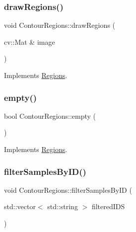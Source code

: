 \subsubsection{\texorpdfstring{draw\+Regions()}{drawRegions()}}
{\footnotesize\ttfamily void Contour\+Regions\+::draw\+Regions (\begin{DoxyParamCaption}\item[{cv\+::\+Mat \&}]{image }\end{DoxyParamCaption})\hspace{0.3cm}{\ttfamily [virtual]}}



Implements \hyperlink{struct_regions_adab32a2a00fc77abb6f4876939dc8505}{Regions}.

\mbox{\label{struct_contour_regions_ab8b13783859be86bdffa78c3a61e1387}} 
\subsubsection{\texorpdfstring{empty()}{empty()}}
{\footnotesize\ttfamily bool Contour\+Regions\+::empty (\begin{DoxyParamCaption}{ }\end{DoxyParamCaption})\hspace{0.3cm}{\ttfamily [virtual]}}



Implements \hyperlink{struct_regions_a5763d0526981f665356ac35734e8e505}{Regions}.

\mbox{\label{struct_contour_regions_a8320d00da57b3362afb70f6886919534}} 
\subsubsection{\texorpdfstring{filter\+Samples\+By\+I\+D()}{filterSamplesByID()}}
{\footnotesize\ttfamily void Contour\+Regions\+::filter\+Samples\+By\+ID (\begin{DoxyParamCaption}\item[{std\+::vector$<$ std\+::string $>$}]{filtered\+I\+DS }\end{DoxyParamCaption})\hspace{0.3cm}{\ttfamily [virtual]}}



